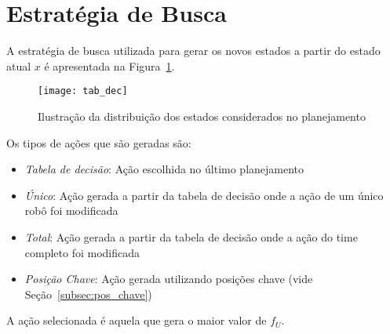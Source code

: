 \section{Estratégia de Busca}\label{sec:est_busca}
A estratégia de busca utilizada para gerar os novos
estados a partir do estado atual $x$ é apresentada na
Figura~\ref{fig:estr_busca}.

\begin{figure}[H]
  \centering
  \texttt{[image: tab\_dec]}
  \caption{Ilustração da distribuição dos estados
           considerados no planejamento}\label{fig:estr_busca}
\end{figure}

Os tipos de ações que são geradas são:
\begin{itemize}
  \item \textit{Tabela de decisão}: Ação escolhida no último planejamento
  \item \textit{Único}: Ação gerada a partir da tabela de decisão
        onde a ação de um único robô foi modificada
  \item \textit{Total}: Ação gerada a partir da tabela de decisão
        onde a ação do time completo foi modificada
  \item \textit{Posição Chave}: Ação gerada utilizando posições chave
        (vide Seção~\ref{subsec:pos_chave})
\end{itemize}

A ação selecionada é aquela que gera o maior valor de $f_U$.




